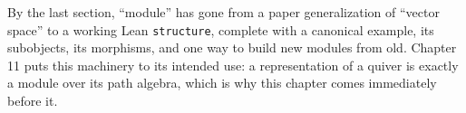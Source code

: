 By the last section, ``module'' has gone from a paper generalization of ``vector space'' to a working Lean \texttt{structure}, complete with a canonical example, its subobjects, its morphisms, and one way to build new modules from old. Chapter 11 puts this machinery to its intended use: a representation of a quiver is exactly a module over its path algebra, which is why this chapter comes immediately before it.









